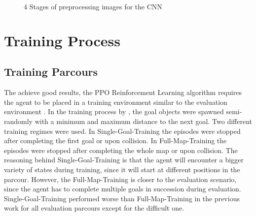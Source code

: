\begin{figure}
     \centering
     \qquad
     \qquad
     \caption{4 Stages of preprocessing images for the CNN}
     \label{fig:4bildchen}
\end{figure}


\section{Training Process}

\subsection*{Training Parcours}
The achieve good results, the PPO Reinforcement Learning algorithm requires the agent to be placed in a training environment similar to the evaluation environment \autocite{rlbook2020}. In the training process by \autocite{maximilian}, the goal objects were spawned semi-randomly with a minimum and maximum distance to the next goal. Two different training regimes were used. In Single-Goal-Training the episodes were stopped after completing the first goal or upon collision. In Full-Map-Training the episodes were stopped after completing the whole map or upon collision. The reasoning behind Single-Goal-Training is that the agent will encounter a bigger variety of states during training, since it will start at different positions in the parcour. However, the Full-Map-Training is closer to the evaluation scenario, since the agent has to complete multiple goals in succession during evaluation.
Single-Goal-Training performed worse than Full-Map-Training in the previous work \autocite{maximilian} for all evaluation parcours except for the difficult one.

